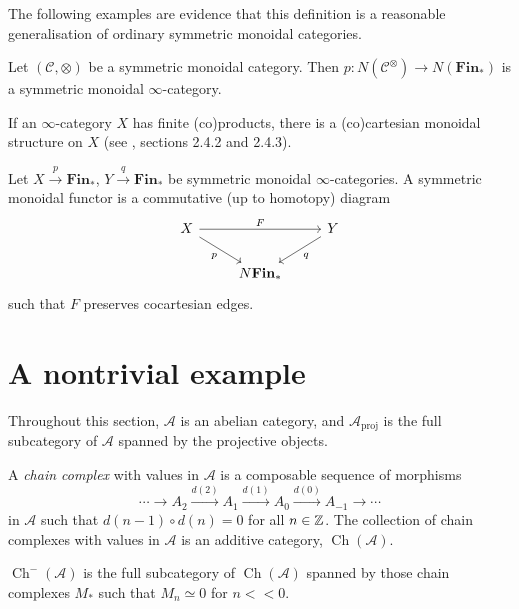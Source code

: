 \documentclass{MetricNotes2023}
\def\inte{\ensuremath\mathbb{Z}}
\DeclareMathOperator{\Ch}{Ch}
\begin{document}
\begin{ourproof}
The following examples are evidence that this definition is a reasonable generalisation of ordinary symmetric monoidal categories. 

\begin{example}
Let \((\mathcal{C}, \otimes)\) be a symmetric monoidal category. Then \(p : N(\mathcal{C}^\otimes) \to N(\textbf{Fin}_*)\) is a symmetric monoidal \(\infty\)-category. 
\end{example}

\begin{example}
If an \(\infty\)-category \(X\) has finite (co)products, there is a (co)cartesian monoidal structure on \(X\) (see \autocite{higheralgebra}, sections 2.4.2 and 2.4.3). 
\end{example}

\begin{definition}
Let \(X \xrightarrow p \textbf{Fin}_*\), \(Y\xrightarrow q \textbf{Fin}_*\) be symmetric monoidal \(\infty\)-categories. A symmetric monoidal functor is a commutative (up to homotopy) diagram
\[\begin{tikzcd}
X \arrow[rr, "F"] \arrow[dr, swap, "p"]  & & Y \arrow[dl, "q"]  \\
& N \textbf{Fin}_*  & 
\end{tikzcd}\]
such that \(F\) preserves cocartesian edges.
\end{definition}

\section{A nontrivial example}

Throughout this section, \(\mathcal{A}\) is an abelian category, and \(\mathcal{A}_{\text{proj}}\) is the full subcategory of \(\mathcal{A}\) spanned by the projective objects. 

\begin{definition}
A \textit{chain complex} with values in \(\mathcal{A}\) is a composable sequence of morphisms 
\[\cdots \to A_2 \xrightarrow{d(2)} A_1 \xrightarrow{d(1)}A_0 \xrightarrow{d(0)} A_{-1}\to \cdots\]
in \(\mathcal{A}\) such that \(d(n-1)\circ d(n)=0\) for all \(n \in \inte\). The collection of chain complexes with values in \(\mathcal{A}\) is an additive category, \(\Ch(\mathcal{A})\). 
\end{definition}

\begin{definition}
\(\Ch^-(\mathcal{A})\) is the full subcategory of \(\Ch(\mathcal{A})\) spanned by those chain complexes \(M_*\) such that \(M_n \simeq 0\) for \(n << 0\). 
\end{definition}


\end{ourproof}
\end{document}
